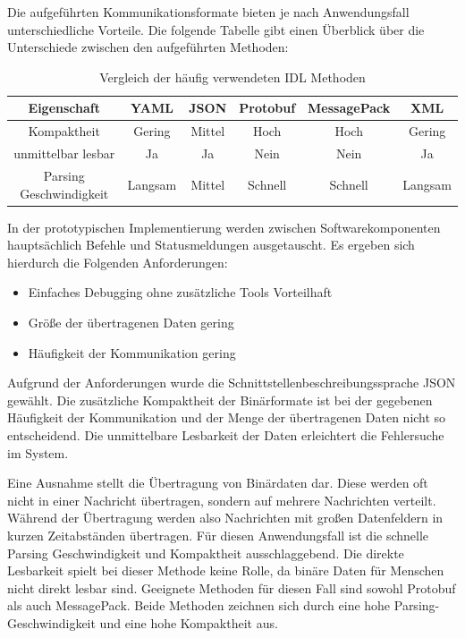 Die aufgeführten Kommunikationsformate bieten je nach Anwendungsfall unterschiedliche Vorteile. Die folgende Tabelle gibt einen Überblick über die Unterschiede zwischen den aufgeführten Methoden:
\begin{table}
    \centering
    \begin{tabular}{|c||c|c|c|c|c|}
        \hline
        \textbf{Eigenschaft} & \textbf{YAML} & \textbf{JSON} & \textbf{Protobuf} & \textbf{MessagePack} & \textbf{XML} \\
        \hline
        \hline
        Kompaktheit & Gering & Mittel & Hoch & Hoch & Gering \\
        \hline
        unmittelbar lesbar & Ja & Ja & Nein & Nein & Ja \\
        \hline
        Parsing Geschwindigkeit & Langsam & Mittel & Schnell & Schnell & Langsam \\
        \hline
    \end{tabular}
    \caption{Vergleich der häufig verwendeten \gls{IDL} Methoden}
\end{table}

In der prototypischen Implementierung werden zwischen Softwarekomponenten hauptsächlich Befehle und Statusmeldungen ausgetauscht. Es ergeben sich hierdurch die Folgenden Anforderungen:

\begin{itemize}
    \item Einfaches Debugging ohne zusätzliche Tools Vorteilhaft
    \item Größe der übertragenen Daten gering
    \item Häufigkeit der Kommunikation gering
\end{itemize}

Aufgrund der Anforderungen wurde die Schnittstellenbeschreibungssprache \gls{JSON} gewählt. Die zusätzliche Kompaktheit der Binärformate ist bei der gegebenen Häufigkeit der Kommunikation und der Menge der übertragenen Daten nicht so entscheidend. Die unmittelbare Lesbarkeit der Daten erleichtert die Fehlersuche im System.

Eine Ausnahme stellt die Übertragung von Binärdaten dar. Diese werden oft nicht in einer Nachricht übertragen, sondern auf mehrere Nachrichten verteilt. Während der Übertragung werden also Nachrichten mit großen Datenfeldern in kurzen Zeitabständen übertragen. Für diesen Anwendungsfall ist die schnelle Parsing Geschwindigkeit und Kompaktheit ausschlaggebend. Die direkte Lesbarkeit spielt bei dieser Methode keine Rolle, da binäre Daten für Menschen nicht direkt lesbar sind. Geeignete Methoden für diesen Fall sind sowohl Protobuf als auch MessagePack. Beide Methoden zeichnen sich durch eine hohe Parsing-Geschwindigkeit und eine hohe Kompaktheit aus.

